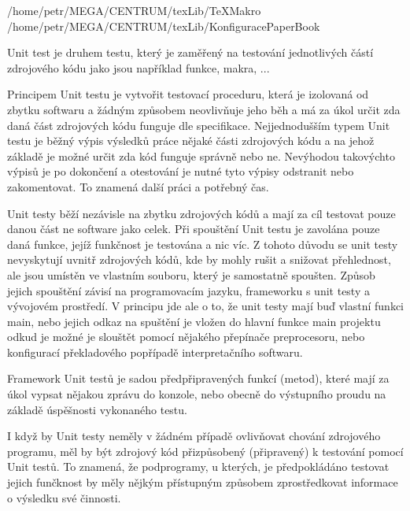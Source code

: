 \def\addr{/home/petr/MEGA/CENTRUM/texLib}

 \addr/TeXMakro
\setAddress{\addr}
 \addr/KonfiguracePaperBook



\Obsah





Unit test je druhem testu, který je zaměřený na testování jednotlivých částí zdrojového kódu jako jsou například funkce, makra, ...


Principem Unit testu je vytvořit testovací proceduru, která je izolovaná od zbytku softwaru a žádným způsobem neovlivňuje jeho běh a má za úkol určit zda daná část zdrojových kódu funguje dle specifikace.  Nejjednodušším typem Unit testu je běžný výpis výsledků práce nějaké části zdrojových kódu a na jehož základě je možné určit zda kód funguje správně nebo ne. Nevýhodou takovýchto výpisů je po dokončení a otestování je nutné tyto výpisy odstranit nebo zakomentovat. To znamená další práci a potřebný čas. 

Unit testy běží nezávisle na zbytku zdrojových kódů a mají za cíl testovat pouze danou část ne software jako celek. Při spouštění Unit testu je zavolána pouze daná funkce, jejíž funkčnost je testována a nic víc. Z tohoto důvodu se unit testy nevyskytují uvnitř zdrojových kódů, kde by mohly rušit a snižovat přehlednost, ale jsou umístěn ve vlastním souboru, který je samostatně spoušten. Způsob jejich spouštění závisí na programovacím jazyku, frameworku s unit testy a vývojovém prostředí. V principu jde ale o to, že unit testy mají buď vlastní funkci main, nebo jejich odkaz na spuštění je vložen do hlavní funkce main projektu odkud je možné je slouštět pomocí nějakého přepínače preprocesoru, nebo konfigurací překladového popřípadě interpretačního softwaru.

Framework Unit testů je sadou předpřipravených funkcí (metod), které mají za úkol vypsat nějakou zprávu do konzole, nebo obecně do výstupního proudu na základě úspěšnosti vykonaného testu.

I když by Unit testy neměly v žádném případě ovlivňovat chování zdrojového programu, měl by být zdrojový kód přizpůsobený (připravený) k testování pomocí Unit testů. To znamená, že podprogramy, u kterých, je předpokládáno testovat jejich funčknost by měly nějkým přístupným způsobem zprostředkovat informace o výsledku své činnosti.

